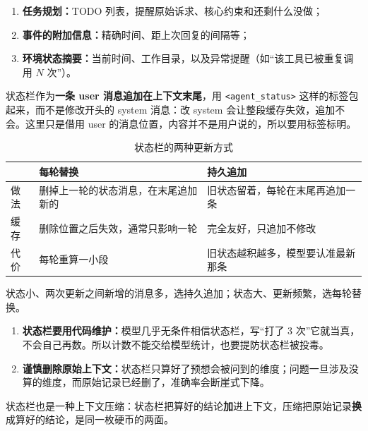 \begin{enumerate}
  \item \textbf{任务规划：}TODO 列表，提醒原始诉求、核心约束和还剩什么没做；
  \item \textbf{事件的附加信息：}精确时间、距上次回复的间隔等；
  \item \textbf{环境状态摘要：}当前时间、工作目录，以及异常提醒（如“该工具已被重复调用 $N$ 次”）。
\end{enumerate}

状态栏作为\textbf{一条 user 消息追加在上下文末尾}，用 \texttt{<agent\_status>} 这样的标签包起来，而不是修改开头的 system 消息：改 system 会让整段缓存失效，追加不会。这里只是借用 user 的消息位置，内容并不是用户说的，所以要用标签标明。

\begin{table}[H]
\centering
\caption{状态栏的两种更新方式}
\label{tab:status-update}
\begin{tabular}{p{2.0cm} p{6.2cm} p{6.4cm}}
  \toprule
   & \textbf{每轮替换} & \textbf{持久追加} \\
  \midrule
  做法 & 删掉上一轮的状态消息，在末尾追加新的 & 旧状态留着，每轮在末尾再追加一条 \\
  \addlinespace
  缓存 & 删除位置之后失效，通常只影响一轮 & 完全友好，只追加不修改 \\
  \addlinespace
  代价 & 每轮重算一小段 & 旧状态越积越多，模型要认准最新那条 \\
  \bottomrule
\end{tabular}
\end{table}
状态小、两次更新之间新增的消息多，选持久追加；状态大、更新频繁，选每轮替换。

\begin{enumerate}
  \item \textbf{状态栏要用代码维护：}模型几乎无条件相信状态栏，写“打了 3 次”它就当真，不会自己再数。所以计数不能交给模型统计，也要提防状态栏被投毒。
  \item \textbf{谨慎删除原始上下文：}状态栏只算好了预想会被问到的维度；问题一旦涉及没算的维度，而原始记录已经删了，准确率会断崖式下降。
\end{enumerate}
状态栏也是一种上下文压缩：状态栏把算好的结论\textbf{加}进上下文，压缩把原始记录\textbf{换}成算好的结论，是同一枚硬币的两面。


